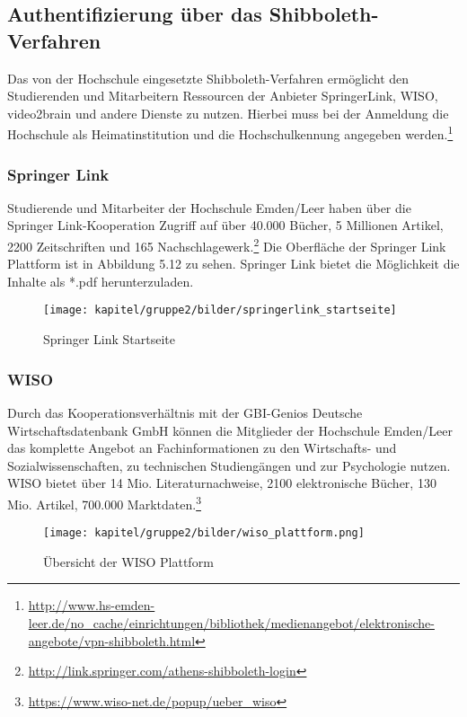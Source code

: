 \subsection{Authentifizierung über das Shibboleth-Verfahren}
Das von der Hochschule eingesetzte Shibboleth-Verfahren ermöglicht den Studierenden und Mitarbeitern 
Ressourcen der Anbieter SpringerLink, WISO, video2brain und andere Dienste zu nutzen. Hierbei muss 
bei der Anmeldung die Hochschule als Heimatinstitution und die Hochschulkennung angegeben werden.\footnote{\url{http://www.hs-emden-leer.de/no_cache/einrichtungen/bibliothek/medienangebot/elektronische-angebote/vpn-shibboleth.html}}

\subsubsection{Springer Link}
Studierende und Mitarbeiter der Hochschule Emden/Leer haben über die Springer Link-Kooperation Zugriff auf über 40.000 Bücher, 5 Millionen Artikel, 2200 Zeitschriften und 165 Nachschlagewerk.\footnote{\url{http://link.springer.com/athens-shibboleth-login}} Die Oberfläche der Springer Link Plattform ist in Abbildung 5.12 zu sehen. Springer Link bietet die Möglichkeit die Inhalte als *.pdf herunterzuladen. 

\begin{figure}[h!]
	\centering
	\texttt{[image: kapitel/gruppe2/bilder/springerlink\_startseite]}
	\caption{Springer Link Startseite}
	\label{fig_springerlink_startseite}
\end{figure}

\subsubsection{WISO}
Durch das Kooperationsverhältnis mit der GBI-Genios Deutsche Wirtschaftsdatenbank GmbH können die Mitglieder der Hochschule Emden/Leer das komplette Angebot an Fachinformationen zu den Wirtschafts- und Sozialwissenschaften, zu technischen Studiengängen und zur Psychologie  nutzen. WISO bietet über 14 Mio. Literaturnachweise, 2100 elektronische Bücher, 130 Mio. Artikel, 700.000 Marktdaten.\footnote{\url{https://www.wiso-net.de/popup/ueber_wiso}}

\begin{figure}[h!]
	\centering
	\texttt{[image: kapitel/gruppe2/bilder/wiso\_plattform.png]}
	\caption{Übersicht der WISO Plattform}
	\label{fig_wiso_plattform.png}
\end{figure}

